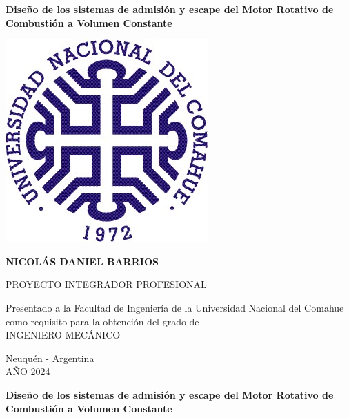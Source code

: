 \documentclass[oneside,a4paper,spanish,links,11pt]{book}
\begin{document}

\renewcommand{\contentsname}{\'Indice}

\thispagestyle{empty}

\begin{center}

\Large\textbf{{Diseño de los sistemas de admisión y escape del Motor Rotativo de Combustión a Volumen Constante\\}}

\vspace{2cm}

\includegraphics[scale=0.65]{logo_unco.jpg}\\

\vspace{1cm}

\Large{\textbf{
NICOLÁS DANIEL BARRIOS\\
}}
\vspace{1cm}

PROYECTO INTEGRADOR PROFESIONAL\\

\vspace{1cm}

Presentado a la Facultad de Ingeniería de la Universidad Nacional del Comahue como requisito para la obtención del grado de \\ INGENIERO MECÁNICO

\vspace{1cm}

Neuquén - Argentina\\
AÑO 2024

\vspace{1cm}

\pagebreak
\thispagestyle{empty}

\Large\textbf{{Diseño de los sistemas de admisión y escape del Motor Rotativo de Combustión a Volumen Constante\\}}



\end{center}
\end{document}
